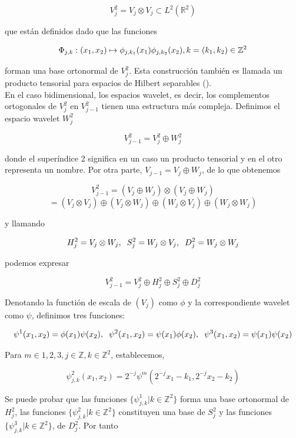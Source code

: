 \begin{itemize}
$$V_j^2 = V_j \otimes V_j \subset L^2(\mathbb{R}^2)$$

que están definidos dado que las funciones

$$\Phi_{j,k}: (x_1,x_2) \mapsto \phi_{j,k_1}(x_1) \phi_{j,k_2}(x_2), \vspace{0.5cm} k= (k_1,k_2) \in \mathbb{Z}^2$$

forman una base ortonormal de $V_j^2$. Esta construcción también es llamada un producto tensorial para espacios de Hilbert separables (\cite{weid}). \\

En el caso bidimensional, los espacios wavelet, es decir, los complementos ortogonales de $V_j^2$ en $V_{j-1}^2$ tienen una estructura más compleja. Definimos el espacio wavelet $W_j^2$ 

$$V_{j-1}^2 = V_j^2 \oplus W_j^2$$

donde el superíndice 2 significa en un caso un producto tensorial y en el otro representa un nombre. Por otra parte, $V_{j-1} = V_j \oplus W_j$, de lo que obtenemos

$$V_{j-1}^2 = (V_j \oplus W_j) \otimes (V_j \oplus W_j)$$
$$ = (V_j \otimes V_j) \oplus (V_j \otimes W_j) \oplus (W_j \otimes V_j) \oplus (W_j \otimes W_j)$$

y llamando

$$H_j^2 = V_j \otimes W_j, \hspace{0.2cm} S_j^2 = W_j \otimes V_j, \hspace{0.2cm} D_j^2 = W_j \otimes W_j$$

podemos expresar

$$V_{j-1}^2 = V_j^2 \oplus H_j^2 \oplus S_j^2 \oplus D_j^2$$

Denotando la functión de escala de $(V_j)$ como $\phi$ y la correspondiente wavelet como $\psi$, definimos tres funciones:

$$\psi^1(x_1,x_2) = \phi(x_1) \psi(x_2), \hspace{0.2cm} \psi^2(x_1,x_2) = \psi(x_1) \phi(x_2), \hspace{0.2cm} \psi^3(x_1,x_2) = \psi(x_1) \psi(x_2)$$

Para $m \in {1,2,3}, j \in \mathbb{Z}, k \in \mathbb{Z}^2$, establecemos,

$$\psi_{j,k}^2(x_1,x_2) = 2^{-j} \psi^m(2^{-j}x_1-k_1,2^{-j}x_2-k_2)$$

Se puede probar que las funciones $\{\psi_{j,k}^1 | k \in \mathbb{Z}^2 \}$ forma una base ortonormal de $H_j^2$, las funciones $\{\psi_{j,k}^2 | k \in \mathbb{Z}^2 \}$ constituyen una base de $S_j^2$ y las funciones $\{\psi_{j,k}^3 | k \in \mathbb{Z}^2 \}$, de $D_j^2$. Por tanto


\end{itemize}
